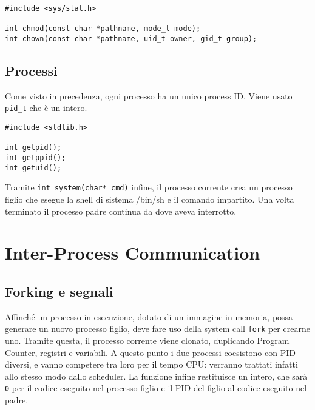 \documentclass[11pt]{article}
\begin{document}
\begin{verbatim}
#include <sys/stat.h>

int chmod(const char *pathname, mode_t mode);
int chown(const char *pathname, uid_t owner, gid_t group);
\end{verbatim}

\subsection{Processi}
Come visto in precedenza, ogni processo ha un unico process ID. Viene usato \verb|pid_t| che è un intero.

\begin{verbatim}
#include <stdlib.h>

int getpid();
int getppid();
int getuid();
\end{verbatim}

Tramite \verb|int system(char* cmd)| infine, il processo corrente crea un processo figlio che esegue la shell di sistema /bin/sh e il comando impartito. Una volta terminato il processo padre continua da dove aveva interrotto.

\section{Inter-Process Communication}

\subsection{Forking e segnali}

Affinché un processo in esecuzione, dotato di un immagine in memoria, possa generare un nuovo processo figlio, deve fare uso della system call \verb|fork| per crearne uno. Tramite questa, il processo corrente viene clonato, duplicando Program Counter, registri e variabili. A questo punto i due processi coesistono con PID diversi, e vanno competere tra loro per il tempo CPU: verranno trattati infatti allo stesso modo dallo scheduler. La funzione infine restituisce un intero, che sarà \verb|0| per il codice eseguito nel processo figlio e il PID del figlio al codice eseguito nel padre.
\end{document}
